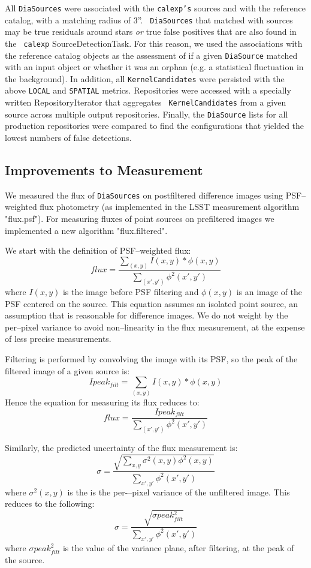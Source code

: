 \documentclass[prd, nofootinbib, floatfix, 11pt,tightenlines,times]{article}
\begin{document}
All {\tt DiaSources} were associated with the {\tt calexp's} sources
and with the reference catalog, with a matching radius of 3''.  {\tt
  DiaSources} that matched with sources may be true residuals around
stars {\it or} true false positives that are also found in the {\tt
  calexp} SourceDetectionTask.  For this reason, we used the
associations with the reference catalog objects as the assessment of
if a given {\tt DiaSource} matched with an input object or whether it
was an orphan (e.g. a statistical fluctuation in the background).  In
addition, all {\tt KernelCandidates} were persisted with the above
{\tt LOCAL} and {\tt SPATIAL} metrics.  Repositories were accessed
with a specially written RepositoryIterator that aggregates {\tt
  KernelCandidates} from a given source across multiple output
repositories.  Finally, the {\tt DiaSource} lists for all production
repositories were compared to find the configurations that yielded the
lowest numbers of false detections.

\subsection{Improvements to Measurement \label{sec-meas}}

We measured the flux of {\tt DiaSources} on postfiltered difference images
using PSF--weighted flux photometry (as implemented in the LSST
measurement algorithm "flux.psf").  For measuring fluxes of point
sources on prefiltered images we implemented a new algorithm
"flux.filtered".

We start with the definition of PSF--weighted flux:
%
\[flux = \frac{\sum_{(x,y)}I(x,y) * \phi(x,y)}{\sum_{(x',y')}\phi^2(x',y')}\]
%
where $I(x,y)$ is the image before PSF filtering and $\phi(x,y)$ is an
image of the PSF centered on the source. This equation assumes an
isolated point source, an assumption that is reasonable for difference
images.  We do not weight by the per--pixel variance to avoid
non--linearity in the flux measurement, at the expense of less precise
measurements.

Filtering is performed by convolving the image with its PSF, so the
peak of the filtered image of a given source is:
%
\[Ipeak_{filt} = \sum_{(x,y)}I(x,y) * \phi(x,y)\]
%
Hence the equation for measuring its flux reduces to:
%
\[flux = \frac{Ipeak_{filt}}{\sum_{(x',y')}\phi^2(x',y')}\]

Similarly, the predicted uncertainty of the flux measurement is:
%
\[\sigma = \frac{\sqrt{\sum_{x,y}\sigma{^2(x,y)}\phi^2(x,y)}}{\sum_{x',y'}\phi^2(x',y')}\]
%
where $\sigma{^2(x,y)}$ is the is the per-–pixel variance of the
unfiltered image. This reduces to the following:
\[\sigma = \frac{\sqrt{\sigma peak{_{filt}^2}}}{\sum_{x',y'}\phi^2(x',y')}\]
%
where $\sigma peak{_{filt}^2}$ is the value of the variance plane,
after filtering, at the peak of the source.
\end{document}
